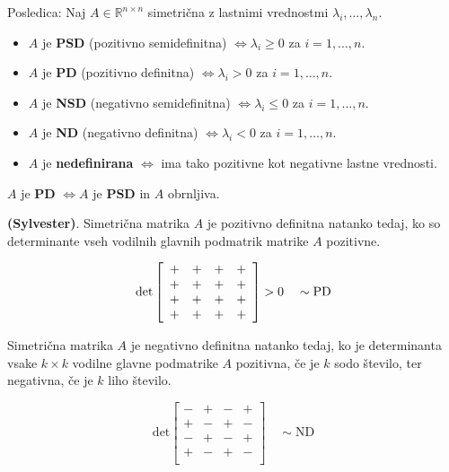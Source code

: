 \documentclass{article}
\begin{document}
\begin{multicols}{2}
Posledica: Naj \( A \in \mathbb{R}^{n \times n} \) simetrična z lastnimi vrednostmi \( \lambda_i, \ldots, \lambda_n \).
\begin{itemize}
  \item \( A \) je \textbf{PSD} (pozitivno semidefinitna) \( \Leftrightarrow \lambda_i \geq 0 \) za \( i=1,\ldots,n \).
  \item \( A \) je \textbf{PD} (pozitivno definitna) \( \Leftrightarrow \lambda_i > 0 \) za \( i=1,\ldots,n \).
  \item \( A \) je \textbf{NSD} (negativno semidefinitna) \( \Leftrightarrow \lambda_i \leq 0 \) za \( i=1,\ldots,n \).
  \item \( A \) je \textbf{ND} (negativno definitna) \( \Leftrightarrow \lambda_i < 0 \) za \( i=1,\ldots,n \).
  \item \( A \) je \textbf{nedefinirana} \( \Leftrightarrow \) ima tako pozitivne kot negativne lastne vrednosti.
\end{itemize}
\( A \) je \textbf{PD} \( \Leftrightarrow A \) je \textbf{PSD} in \( A \) obrnljiva.

\textbf{(Sylvester)}. Simetrična matrika \( A \) je pozitivno definitna natanko tedaj, ko so determinante vseh vodilnih glavnih podmatrik matrike \( A \) pozitivne.

\[
\text{det} \left[
\begin{array}{cccc}
+ & + & + & + \\
+ & + & + & + \\
+ & + & + & + \\
+ & + & + & + \\
\end{array}
\right] > 0 \quad \sim \text{PD} \\
\]

Simetrična matrika \( A \) je negativno definitna natanko tedaj, ko je determinanta vsake \( k \times k \) vodilne glavne podmatrike \( A \) pozitivna, če je \( k \) sodo število, ter negativna, če je \( k \) liho število.

\[
\text{det} \left[
\begin{array}{cccc}
- & + & - & + \\
+ & - & + & - \\
- & + & - & + \\
+ & - & + & - \\
\end{array}
\right] \quad \sim \text{ND}
\]


\end{multicols}
\end{document}
